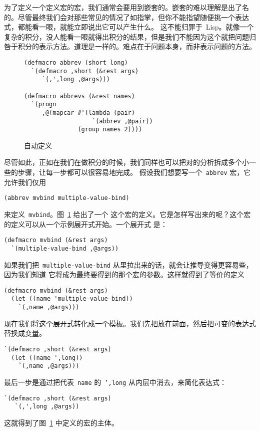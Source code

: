 为了定义一个定义宏的宏，我们通常会要用到嵌套的\bq{}。嵌套\bq{}的难以理解是出了名的。尽管最终我们会对那些常见的情况了如指掌，但你不能指望随便挑一个\bq{}表达式，都能看一眼，就能立即说出它可以产生什么。
这不能归罪于~Lisp。就像一个复杂的积分，没人能看一眼就得出积分的结果，但是我们不能因为这个就把问题归咎于积分的表示方法。道理是一样的。难点在于问题本身，而非表示问题的方法。

\begin{figure}
\begin{lstlisting}
(defmacro abbrev (short long)
  `(defmacro ,short (&rest args)
     `(,',long ,@args)))

(defmacro abbrevs (&rest names)
  `(progn
     ,@(mapcar #'(lambda (pair)
                   `(abbrev ,@pair))
               (group names 2))))
\end{lstlisting}
  \caption{自动定义\abbrev{}}
  \label{fig:automatic_definition_of_abbreviations}
\end{figure}

尽管如此，正如在我们在做积分的时候，我们同样也可以把对\bq{}的分析拆成多个小一些的步骤，让每一步都可以很容易地完成。
假设我们想要写一个~\texttt{abbrev} 宏，它允许我们仅用
\begin{lstlisting}
(abbrev mvbind multiple-value-bind)
\end{lstlisting}
来定义~\texttt{mvbind}。图~\ref{fig:automatic_definition_of_abbreviations} 给出了一个
这个宏的定义。它是怎样写出来的呢？这个宏的定义可以从一个示例展开式开始。一个展开式
是：
\begin{lstlisting}
(defmacro mvbind (&rest args)
  `(multiple-value-bind ,@args))
\end{lstlisting}
如果我们把~\texttt{multiple-value-bind} 从\bq{}里拉出来的话，就会让推导变得更容易些，因为我们知道
它将成为最终要得到的那个宏的参数。这样就得到了等价的定义
\begin{lstlisting}
(defmacro mvbind (&rest args)
  (let ((name 'multiple-value-bind))
    `(,name ,@args)))
\end{lstlisting}
现在我们将这个展开式转化成一个模板。我们先把\bq{}放在前面，然后把可变的表达式替换成变量。
\begin{lstlisting}
`(defmacro ,short (&rest args)
  (let ((name ',long))
    `(,name ,@args)))
\end{lstlisting}
最后一步是通过把代表~\texttt{name} 的~\texttt{',long} 从内层\bq{}中消去，来简化表达式：
\begin{lstlisting}
`(defmacro ,short (&rest args)
   `(,',long ,@args))
\end{lstlisting}
这就得到了图~\ref{fig:automatic_definition_of_abbreviations} 中定义的宏的主体。

